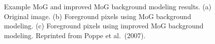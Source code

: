 \begin{figure}[t]
  \centering
  \hspace{0.1in}
  \hspace{0.1in}
  \caption[Example MoG and improved MoG background modeling
    results.]{\small Example MoG and improved MoG background modeling
    results. (a) Original image. (b) Foreground pixels using MoG
    background modeling. (c) Foreground pixels using improved MoG
    background modeling. Reprinted from Poppe et al.\ (2007).}
  \label{fig:poppe-bck-model-results}
\end{figure}

